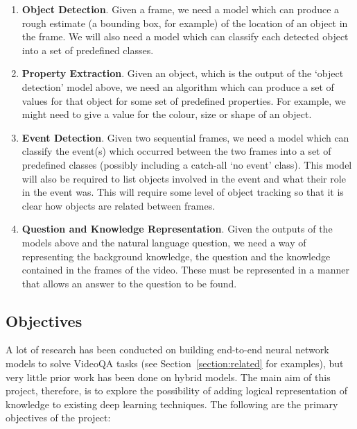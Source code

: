 \documentclass[../interim.tex]{subfiles}
\begin{document}
\begin{enumerate}
  \item \textbf{Object Detection}. Given a frame, we need a model which can produce a rough estimate (a bounding box, for example) of the location of an object in the frame. We will also need a model which can classify each detected object into a set of predefined classes.

  \item \textbf{Property Extraction}. Given an object, which is the output of the `object detection' model above, we need an algorithm which can produce a set of values for that object for some set of predefined properties. For example, we might need to give a value for the colour, size or shape of an object.

  \item \textbf{Event Detection}. Given two sequential frames, we need a model which can classify the event(s) which occurred between the two frames into a set of predefined classes (possibly including a catch-all `no event' class). This model will also be required to list objects involved in the event and what their role in the event was. This will require some level of object tracking so that it is clear how objects are related between frames.

  \item \textbf{Question and Knowledge Representation}. Given the outputs of the models above and the natural language question, we need a way of representing the background knowledge, the question and the knowledge contained in the frames of the video. These must be represented in a manner that allows an answer to the question to be found.
\end{enumerate}


\subsection{Objectives}

A lot of research has been conducted on building end-to-end neural network models to solve VideoQA tasks (see Section~\ref{section:related} for examples), but very little prior work has been done on hybrid models. The main aim of this project, therefore, is to explore the possibility of adding logical representation of knowledge to existing deep learning techniques. The following are the primary objectives of the project:
\end{document}
